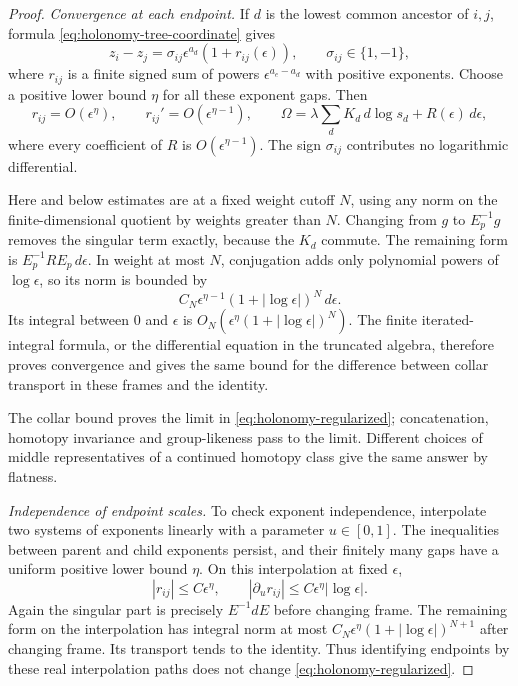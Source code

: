 \begin{proof}
\emph{Convergence at each endpoint.}
If $d$ is the lowest common ancestor of $i,j$, formula
\eqref{eq:holonomy-tree-coordinate} gives
\begin{equation}\label{eq:holonomy-collar-difference}
 z_i-z_j=\sigma_{ij}\epsilon^{a_d}(1+r_{ij}(\epsilon)),
 \qquad \sigma_{ij}\in\{1,-1\},
\end{equation}
where $r_{ij}$ is a finite signed sum of powers
$\epsilon^{a_e-a_d}$ with positive exponents.  Choose a positive lower
bound $\eta$ for all these exponent gaps.  Then
\[
 r_{ij}=O(\epsilon^\eta),\qquad
 r_{ij}'=O(\epsilon^{\eta-1}),\qquad
 \Omega=\lambda\sum_d K_d\,d\log s_d+R(\epsilon)\,d\epsilon,
\]
where every coefficient of $R$ is $O(\epsilon^{\eta-1})$.
The sign $\sigma_{ij}$ contributes no logarithmic differential.

Here and below estimates are at a fixed weight cutoff $N$, using any
norm on the finite-dimensional quotient by weights greater than $N$.
Changing from $g$ to $E_p^{-1}g$ removes the singular term exactly,
because the $K_d$ commute.  The remaining form is
$E_p^{-1}R E_p\,d\epsilon$.  In weight at most $N$, conjugation adds
only polynomial powers of $\log\epsilon$, so its norm is bounded by
\begin{equation}\label{eq:holonomy-collar-bound}
 C_N\epsilon^{\eta-1}(1+|\log\epsilon|)^N\,d\epsilon.
\end{equation}
Its integral between $0$ and $\epsilon$ is
$O_N(\epsilon^\eta(1+|\log\epsilon|)^N)$.
The finite iterated-integral formula, or the differential equation in
the truncated algebra, therefore proves convergence and gives the
same bound for the difference between collar transport in these
frames and the identity.

The collar bound proves the limit in
\eqref{eq:holonomy-regularized}; concatenation, homotopy invariance
and group-likeness pass to the limit.  Different choices of middle
representatives of a continued homotopy class give the same answer by
flatness.

\emph{Independence of endpoint scales.}
To check exponent independence, interpolate two systems of exponents
linearly with a parameter $u\in[0,1]$.  The inequalities between parent
and child exponents persist, and their finitely many gaps have a
uniform positive lower bound $\eta$.  On this interpolation at fixed
$\epsilon$,
\[
 |r_{ij}|\leq C\epsilon^\eta,
 \qquad |\partial_u r_{ij}|
 \leq C\epsilon^\eta|\log\epsilon|.
\]
Again the singular part is precisely $E^{-1}dE$ before changing frame.
The remaining form on the interpolation has integral norm at most
$C_N\epsilon^\eta(1+|\log\epsilon|)^{N+1}$ after changing frame.
Its transport tends to the identity.  Thus identifying endpoints by
these real interpolation paths does not change
\eqref{eq:holonomy-regularized}.


\end{proof}
